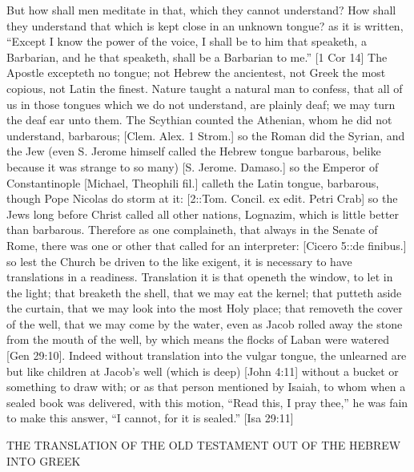 {\par }{\IP But how shall men meditate in that, which they cannot understand? How shall they understand that which is kept close in an unknown tongue? as it is written, “Except I know the power of the voice, I shall be to him that speaketh, a Barbarian, and he that speaketh, shall be a Barbarian to me.” [1 Cor 14] The Apostle excepteth no tongue; not Hebrew the ancientest, not Greek the most copious, not Latin the finest. Nature taught a natural man to confess, that all of us in those tongues which we do not understand, are plainly deaf; we may turn the deaf ear unto them. The Scythian counted the Athenian, whom he did not understand, barbarous; [Clem. Alex. 1 Strom.] so the Roman did the Syrian, and the Jew (even S. Jerome himself called the Hebrew tongue barbarous, belike because it was strange to so many) [S. Jerome. Damaso.] so the Emperor of Constantinople [Michael, Theophili fil.] calleth the Latin tongue, barbarous, though Pope Nicolas do storm at it: [2::Tom. Concil. ex edit. Petri Crab] so the Jews long before Christ called all other nations, Lognazim, which is little better than barbarous. Therefore as one complaineth, that always in the Senate of Rome, there was one or other that called for an interpreter: [Cicero 5::de finibus.] so lest the Church be driven to the like exigent, it is necessary to have translations in a readiness. Translation it is that openeth the window, to let in the light; that breaketh the shell, that we may eat the kernel; that putteth aside the curtain, that we may look into the most Holy place; that removeth the cover of the well, that we may come by the water, even as Jacob rolled away the stone from the mouth of the well, by which means the flocks of Laban were watered [Gen 29:10]. Indeed without translation into the vulgar tongue, the unlearned are but like children at Jacob’s well (which is deep) [John 4:11] without a bucket or something to draw with; or as that person mentioned by Isaiah, to whom when a sealed book was delivered, with this motion, “Read this, I pray thee,” he was fain to make this answer, “I cannot, for it is sealed.” [Isa 29:11]
\par }{\IS THE TRANSLATION OF THE OLD TESTAMENT OUT OF THE HEBREW INTO GREEK
}
